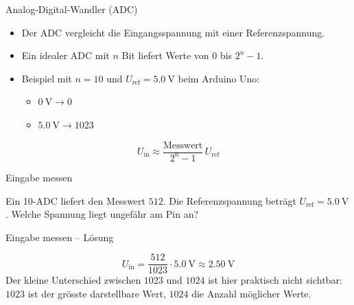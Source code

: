 \begin{frame}{Analog-Digital-Wandler (ADC)}
	\begin{itemize}[<+->]
		\item Der ADC vergleicht die Eingangsspannung mit einer Referenzspannung.
		\item Ein idealer ADC mit $n$ Bit liefert Werte von $0$ bis $2^n-1$.
		\item Beispiel mit $n=10$ und $U_\mathrm{ref}=\qty{5.0}{\volt}$ beim Arduino Uno:
		\begin{itemize}
			\item $\qty{0}{\volt}\rightarrow 0$
			\item $\qty{5.0}{\volt}\rightarrow 1023$
		\end{itemize}
	\end{itemize}
	\[
		U_\mathrm{in}\approx\frac{\text{Messwert}}{2^n-1}\,U_\mathrm{ref}
	\]
\end{frame}

\begin{frame}{Eingabe messen}
	\begin{myexercise}
		Ein \qty{10}{\bit}-ADC liefert den Messwert $512$. Die Referenzspannung beträgt
		$U_\mathrm{ref}=\qty{5.0}{\volt}$. Welche Spannung liegt ungefähr am Pin an?
	\end{myexercise}
\end{frame}

\begin{frame}{Eingabe messen -- Lösung}
	\begin{myanswer}
		\[
			U_\mathrm{in}=\frac{512}{1023}\cdot\qty{5.0}{\volt}
			\approx\qty{2.50}{\volt}
		\]
		Der kleine Unterschied zwischen $1023$ und $1024$ ist hier praktisch nicht sichtbar:
		$1023$ ist der grösste darstellbare Wert, $1024$ die Anzahl möglicher Werte.
	\end{myanswer}
\end{frame}

